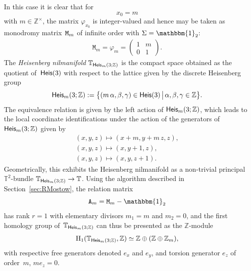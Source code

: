 \documentclass[pdftex]{sigma}
\numberwithin{equation}{section}
\newcommand{\Z}{\zed}
\newcommand{\unit}{\mathbbm{1}} 			%
\newcommand{\ttM}{\mathtt{M}}
\newcommand{\Heis}{{\sf Heis}}
\newcommand{\zed}{{\mathbb Z}} %
\newcommand{\torus}{{\mathbb T}} %
\begin{document}
In this case it is clear that for
\[
x_0=m
\]
with $m\in\Z^\times$, the matrix $\varphi_{x_0}$ is integer-valued and hence
may be taken as monodromy matrix~${\tt M}_m$ of infinite order with $\Sigma=\unit_2$:
\begin{gather}\label{eq:parmon}
\ttM_m = \varphi_m = \left( \begin{matrix}
1 & m \\
0 & 1
\end{matrix} \right) .
\end{gather}
The \emph{Heisenberg nilmanifold} $\torus_{\Heis_m(3;\Z)}$ is the compact
space obtained as the quotient of~$\Heis(3)$ with respect to the
lattice given by the discrete Heisenberg group
\[
\Heis_m(3;\Z):=\big\{(m\,\alpha,\beta,\gamma)\in\Heis(3)\, \big|\,
\alpha,\beta,\gamma\in\zed\big\} .
\]
The equivalence relation
is given by the left action of $\Heis_m(3;\Z)$, which
leads to the local coordinate identifications under the action of the
generators of $\Heis_m(3;\Z)$ given by
\begin{gather}
(x,y,z)\longmapsto (x+m,y+m\,z,z) , \nonumber \\
(x,y,z)\longmapsto (x,y+1,z) , \nonumber \\
(x,y,z)\longmapsto (x,y,z+1) .\label{eq:H3integeraction}
\end{gather}
Geometrically, this exhibits the Heisenberg nilmanifold as a
non-trivial principal $\torus^2$-bundle
$\torus_{\Heis_m(3;\Z)}\rightarrow \torus$.
Using the algorithm described in Section~\ref{sec:RMostow}, the
relation matrix
\[
{\tt A}_m = \ttM_m-\unit_2
\]
has rank $r=1$ with elementary divisors
$m_1=m$ and $m_2=0$, and the first homology group of~$\torus_{\Heis_m(3;\Z)}$ can thus be presented as the $\Z$-module
\begin{gather*}%
{\rm H}_1(\torus_{\Heis_m(3;\Z)},\Z) \simeq \Z
\oplus(\Z\oplus\Z_m) ,
\end{gather*}
with respective free generators denoted $e_x$ and $e_y$, and torsion
generator $e_z$ of order~$m$, $m e_z=0$.
\end{document}
